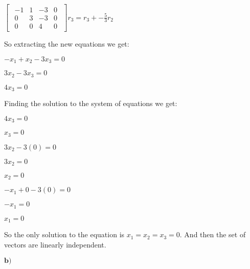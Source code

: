 \singlespacing

\begin{math}
    \begin{bmatrix}
        \begin{array}{ccc|c}
            -1 & 1 & -3 & 0 \\
            0  & 3 & -3 & 0 \\
            0  & 0 & 4  & 0
        \end{array}
    \end{bmatrix}r_3 = r_3 + -\frac{5}{3}r_2
\end{math}

\singlespacing
\singlespacing
So extracting the new equations we get:

\singlespacing
\singlespacing

\begin{math}
    -x_1 + x_2 - 3x_3 = 0
\end{math}

\singlespacing

\begin{math}
    3x_2 - 3x_3 = 0
\end{math}

\singlespacing

\begin{math}
    4x_3 = 0
\end{math}

\singlespacing
\singlespacing
Finding the solution to the system of equations we get:

\singlespacing

$4x_3 = 0$

$x_3 = 0$

\singlespacing

$3x_2 - 3(0) = 0$

$3x_2 = 0$

$x_2 = 0$

\singlespacing

$-x_1 + 0 - 3(0) = 0$

$-x_1 = 0$

$x_1 = 0$

\singlespacing

So the only solution to the equation is $x_1 = x_2 = x_3 = 0$. And then the set of vectors are linearly independent.

\singlespacing
\singlespacing
$\textbf{b)}$

\singlespacing

